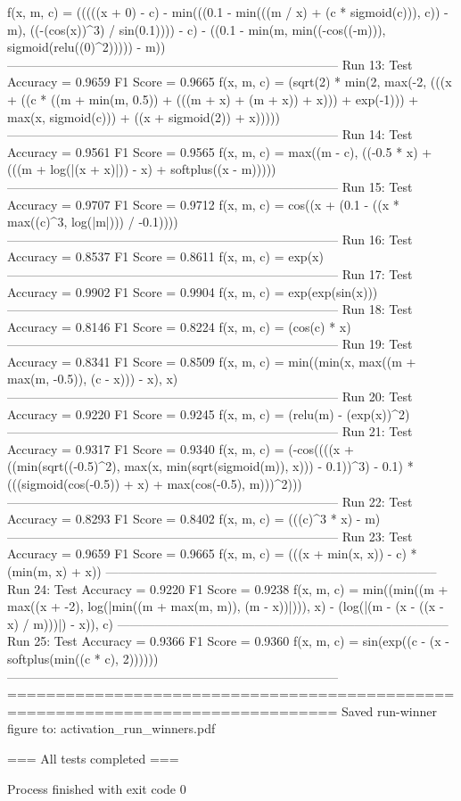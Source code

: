    f(x, m, c)    = (((((x + 0) - c) - min(((0.1 - min(((m / x) + (c * sigmoid(c))), c)) - m), ((-(cos(x))^3) / sin(0.1)))) - c) - ((0.1 - min(m, min((-cos((-m))), sigmoid(relu((0)^2))))) - m))
--------------------------------------------------------------------------------
Run 13:
   Test Accuracy = 0.9659
   F1 Score      = 0.9665
   f(x, m, c)    = (sqrt(2) * min(2, max(-2, (((x + ((c * ((m + min(m, 0.5)) + (((m + x) + (m + x)) + x))) + exp(-1))) + max(x, sigmoid(c))) + ((x + sigmoid(2)) + x)))))
--------------------------------------------------------------------------------
Run 14:
   Test Accuracy = 0.9561
   F1 Score      = 0.9565
   f(x, m, c)    = max((m - c), ((-0.5 * x) + (((m + log(|(x + x)|)) - x) + softplus((x - m)))))
--------------------------------------------------------------------------------
Run 15:
   Test Accuracy = 0.9707
   F1 Score      = 0.9712
   f(x, m, c)    = cos((x + (0.1 - ((x * max((c)^3, log(|m|))) / -0.1))))
--------------------------------------------------------------------------------
Run 16:
   Test Accuracy = 0.8537
   F1 Score      = 0.8611
   f(x, m, c)    = exp(x)
--------------------------------------------------------------------------------
Run 17:
   Test Accuracy = 0.9902
   F1 Score      = 0.9904
   f(x, m, c)    = exp(exp(sin(x)))
--------------------------------------------------------------------------------
Run 18:
   Test Accuracy = 0.8146
   F1 Score      = 0.8224
   f(x, m, c)    = (cos(c) * x)
--------------------------------------------------------------------------------
Run 19:
   Test Accuracy = 0.8341
   F1 Score      = 0.8509
   f(x, m, c)    = min((min(x, max((m + max(m, -0.5)), (c - x))) - x), x)
--------------------------------------------------------------------------------
Run 20:
   Test Accuracy = 0.9220
   F1 Score      = 0.9245
   f(x, m, c)    = (relu(m) - (exp(x))^2)
--------------------------------------------------------------------------------
Run 21:
   Test Accuracy = 0.9317
   F1 Score      = 0.9340
   f(x, m, c)    = (-cos((((x + ((min(sqrt((-0.5)^2), max(x, min(sqrt(sigmoid(m)), x))) - 0.1))^3) - 0.1) * (((sigmoid(cos(-0.5)) + x) + max(cos(-0.5), m)))^2)))
--------------------------------------------------------------------------------
Run 22:
   Test Accuracy = 0.8293
   F1 Score      = 0.8402
   f(x, m, c)    = (((c)^3 * x) - m)
--------------------------------------------------------------------------------
Run 23:
   Test Accuracy = 0.9659
   F1 Score      = 0.9665
   f(x, m, c)    = (((x + min(x, x)) - c) * (min(m, x) + x))
--------------------------------------------------------------------------------
Run 24:
   Test Accuracy = 0.9220
   F1 Score      = 0.9238
   f(x, m, c)    = min((min((m + max((x + -2), log(|min((m + max(m, m)), (m - x))|))), x) - (log(|(m - (x - ((x - x) / m)))|) - x)), c)
--------------------------------------------------------------------------------
Run 25:
   Test Accuracy = 0.9366
   F1 Score      = 0.9360
   f(x, m, c)    = sin(exp((c - (x - softplus(min((c * c), 2))))))
--------------------------------------------------------------------------------
================================================================================
Saved run-winner figure to: activation_run_winners.pdf

=== All tests completed ===

Process finished with exit code 0
